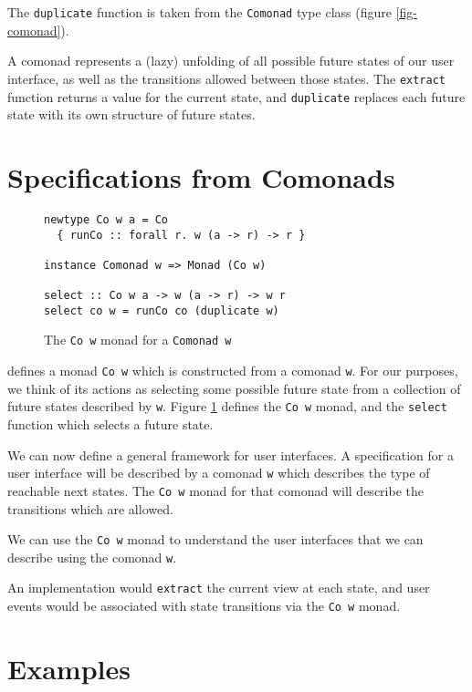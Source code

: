 \documentclass[nocopyrightspace]{sigplanconf}
\begin{document}
The \texttt{duplicate} function is taken from the \texttt{Comonad} type class
(figure \ref{fig-comonad}).

A comonad represents a (lazy) unfolding of all possible future states of our user interface, as well as
the transitions allowed between those states. The \texttt{extract} function returns
a value for the current state, and \texttt{duplicate}
replaces each future state with its own structure of future states.

\section{Specifications from Comonads}

\begin{figure}
\begin{verbatim}
newtype Co w a = Co
  { runCo :: forall r. w (a -> r) -> r }

instance Comonad w => Monad (Co w)

select :: Co w a -> w (a -> r) -> w r
select co w = runCo co (duplicate w)
\end{verbatim}
\caption{The \texttt{Co w} monad for a \texttt{Comonad w} \citep{kmett}}
\label{fig-transition}
\end{figure}

\citet{kmett} defines a monad \texttt{Co w} which is
constructed from a comonad \texttt{w}. For our purposes, we
think of its actions as selecting some possible future state from a collection of
future states described by \texttt{w}. Figure \ref{fig-transition} defines the \texttt{Co w} monad, and
the \texttt{select} function which selects a future state.

We can now define a general framework for user interfaces.
A specification for a user interface will be described by a comonad \texttt{w} which describes
the type of reachable next states. The \texttt{Co w} monad for that comonad will
describe the transitions which are allowed.

We can use the \texttt{Co w} monad to understand the user interfaces that we
can describe using the comonad \texttt{w}.

An implementation would \texttt{extract} the current view at each state, and
user events would be associated with state transitions via the \texttt{Co w} monad.

\section{Examples}
\end{document}
